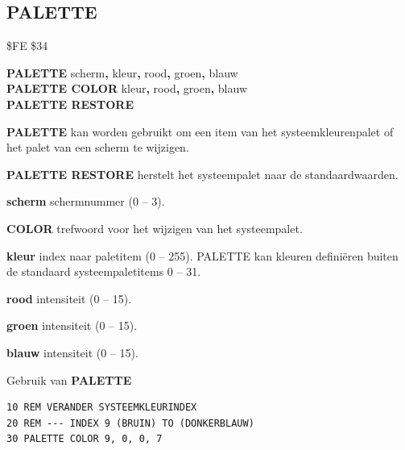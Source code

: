 
\newpage
\subsection{PALETTE}
\begin{description}[leftmargin=2cm,style=nextline]
\item [Token:]    \$FE \$34

\item [Formaat:]   {\bf PALETTE} scherm{\bf,} kleur{\bf,} rood{\bf,} groen{\bf,} blauw \\                {\bf PALETTE COLOR} kleur{\bf,} rood{\bf,} groen{\bf,} blauw \\                  {\bf PALETTE RESTORE}

\item [Gebruik:]    {\bf PALETTE} kan worden gebruikt om een item van het systeemkleurenpalet of het palet van een scherm te wijzigen.

                  {\bf PALETTE RESTORE} herstelt het systeempalet naar de standaardwaarden.

{\bf scherm} schermnummer (0 -- 3).

                  {\bf COLOR} trefwoord voor het wijzigen van het systeempalet.

{\bf kleur} index naar paletitem (0 -- 255). PALETTE kan kleuren definiëren buiten de standaard systeempaletitems 0 -- 31.

{\bf rood} intensiteit (0 -- 15).

{\bf groen} intensiteit (0 -- 15).

{\bf blauw} intensiteit (0 -- 15).

\item [Voorbeelden:] Gebruik van {\bf PALETTE}

\begin{tcolorbox}[colback=black,coltext=white]
\verbatimfont{\codefont}
\begin{verbatim}
10 REM VERANDER SYSTEEMKLEURINDEX
20 REM --- INDEX 9 (BRUIN) TO (DONKERBLAUW)
30 PALETTE COLOR 9, 0, 0, 7
\end{verbatim}
\end{tcolorbox}


\end{description}
